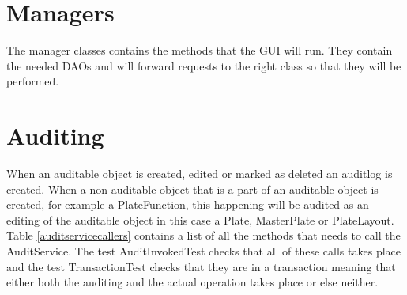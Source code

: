 \documentclass[a4paper,10pt]{article}
\begin{document}
	\newpage
	
	\section{Managers}
	\begin{multicols}{2}
    	\noindent
    	The manager classes contains the methods that the GUI will run. They
    	contain the needed DAOs and will forward requests to the right class
    	so that they will be performed. 
    \end{multicols}


	\section{Auditing}
	\begin{multicols}{2}
    	\noindent
    	When an auditable object is created, edited or marked as deleted an
    	auditlog is created. When a non-auditable object that is a part of an
    	auditable object is created, for example a PlateFunction, this happening
    	will be audited as an editing of the auditable object in this case a
    	Plate, MasterPlate or PlateLayout. Table \ref{auditservicecallers}
        contains a list of all the methods that needs to call the AuditService.
        The test AuditInvokedTest checks that all of these calls takes place and
        the test TransactionTest checks that they are in a transaction meaning 
        that either	both the auditing and the actual operation takes place or 
        else neither.
    \end{multicols}
\end{document}

